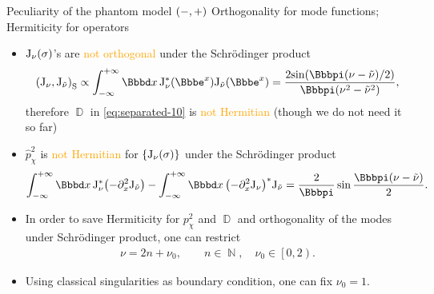 \documentclass[9pt]{beamer}
\begin{document}
\begin{frame}%
{Peculiarity of the phantom model ${\left(-,+\right)}$}%
{Orthogonality for mode functions; Hermiticity for operators}
\begin{itemize}

\item ${\mathrm{J}_{\nu}}\mathopen{}\left(\sigma\right)\mathclose{}$'s are
\textcolor{orange}{not orthogonal} under the Schrödinger product
\begin{align}
\rbr{\mathrm{J}_{\nu},\mathrm{J}_{\tilde{\nu}}}_\text{S}
\propto \int_{-\infty}^{+\infty} \dd x\,
\rfun{\mathrm{J}_{\nu}^*}{\ee^x}
\rfun{\mathrm{J}_{\tilde{\nu}}}{\ee^x} =
\frac{2\rfun{\sin}{\pp\rbr{\nu-\tilde{\nu}}/2}}{\pp\rbr{\nu^2-\tilde{\nu}^2}},
\end{align}
therefore $\BbbD$ in \cref{eq:separated-10} is
\textcolor{orange}{not Hermitian} (though we do not need it so far)

\item $\widehat{p}_\chi^2$ is \textcolor{orange}{not Hermitian} for
${\left\{{\mathrm{J}_{\nu}}\mathopen{}\left(\sigma\right)\mathclose{}\right\}}$ under the Schrödinger product
\begin{align}
\int_{-\infty}^{+\infty} \dd x\,
\mathrm{J}_{\nu}^*\rbr{-\partial_x^2\mathrm{J}_{\tilde{\nu}}}
-\int_{-\infty}^{+\infty} \dd x\,
\rbr{-\partial_x^2\mathrm{J}_{\nu}}^*\mathrm{J}_{\tilde{\nu}}
= \frac{2}{\pp}\sin\frac{\pp\rbr{\nu-\tilde{\nu}}}{2}.
\end{align}

\item In order to save Hermiticity for $p_\chi^2$ and $\BbbD$ and 
orthogonality of the modes under Schrödinger product, one can restrict
\begin{align}
\nu = 2n+\nu_0,\qquad n\in\BbbN,\quad\nu_0\in \left[0,2\right).
\end{align}

\item Using classical singularities as boundary condition, one can fix
$\nu_0 = 1$.
\end{itemize}

\end{frame}
\end{document}
